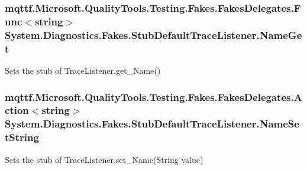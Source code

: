 \hypertarget{class_system_1_1_diagnostics_1_1_fakes_1_1_stub_default_trace_listener_a1949c8960e458ddac470ea0830771356}{
\subsubsection[{Name\-Get}]{\setlength{\rightskip}{0pt plus 5cm}mqttf.\-Microsoft.\-Quality\-Tools.\-Testing.\-Fakes.\-Fakes\-Delegates.\-Func$<$string$>$ System.\-Diagnostics.\-Fakes.\-Stub\-Default\-Trace\-Listener.\-Name\-Get}}\label{class_system_1_1_diagnostics_1_1_fakes_1_1_stub_default_trace_listener_a1949c8960e458ddac470ea0830771356}


Sets the stub of Trace\-Listener.\-get\-\_\-\-Name()

\hypertarget{class_system_1_1_diagnostics_1_1_fakes_1_1_stub_default_trace_listener_abce1b50d9ff55c8528782265e40d8009}{
\subsubsection[{Name\-Set\-String}]{\setlength{\rightskip}{0pt plus 5cm}mqttf.\-Microsoft.\-Quality\-Tools.\-Testing.\-Fakes.\-Fakes\-Delegates.\-Action$<$string$>$ System.\-Diagnostics.\-Fakes.\-Stub\-Default\-Trace\-Listener.\-Name\-Set\-String}}\label{class_system_1_1_diagnostics_1_1_fakes_1_1_stub_default_trace_listener_abce1b50d9ff55c8528782265e40d8009}


Sets the stub of Trace\-Listener.\-set\-\_\-\-Name(\-String value)

